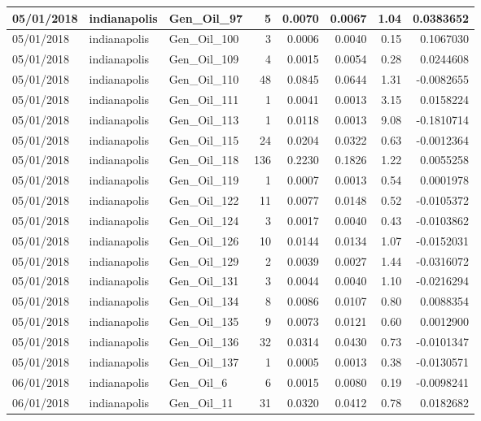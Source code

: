 \documentclass[
  letterpaper,
  DIV=11,
  numbers=noendperiod]{scrartcl}
\begin{document}
\begin{tabular}{l|l|l|r|r|r|r|r}
\hline
05/01/2018 & indianapolis & Gen\_Oil\_97 & 5 & 0.0070 & 0.0067 & 1.04 & 0.0383652\\
\hline
05/01/2018 & indianapolis & Gen\_Oil\_100 & 3 & 0.0006 & 0.0040 & 0.15 & 0.1067030\\
\hline
05/01/2018 & indianapolis & Gen\_Oil\_109 & 4 & 0.0015 & 0.0054 & 0.28 & 0.0244608\\
\hline
05/01/2018 & indianapolis & Gen\_Oil\_110 & 48 & 0.0845 & 0.0644 & 1.31 & -0.0082655\\
\hline
05/01/2018 & indianapolis & Gen\_Oil\_111 & 1 & 0.0041 & 0.0013 & 3.15 & 0.0158224\\
\hline
05/01/2018 & indianapolis & Gen\_Oil\_113 & 1 & 0.0118 & 0.0013 & 9.08 & -0.1810714\\
\hline
05/01/2018 & indianapolis & Gen\_Oil\_115 & 24 & 0.0204 & 0.0322 & 0.63 & -0.0012364\\
\hline
05/01/2018 & indianapolis & Gen\_Oil\_118 & 136 & 0.2230 & 0.1826 & 1.22 & 0.0055258\\
\hline
05/01/2018 & indianapolis & Gen\_Oil\_119 & 1 & 0.0007 & 0.0013 & 0.54 & 0.0001978\\
\hline
05/01/2018 & indianapolis & Gen\_Oil\_122 & 11 & 0.0077 & 0.0148 & 0.52 & -0.0105372\\
\hline
05/01/2018 & indianapolis & Gen\_Oil\_124 & 3 & 0.0017 & 0.0040 & 0.43 & -0.0103862\\
\hline
05/01/2018 & indianapolis & Gen\_Oil\_126 & 10 & 0.0144 & 0.0134 & 1.07 & -0.0152031\\
\hline
05/01/2018 & indianapolis & Gen\_Oil\_129 & 2 & 0.0039 & 0.0027 & 1.44 & -0.0316072\\
\hline
05/01/2018 & indianapolis & Gen\_Oil\_131 & 3 & 0.0044 & 0.0040 & 1.10 & -0.0216294\\
\hline
05/01/2018 & indianapolis & Gen\_Oil\_134 & 8 & 0.0086 & 0.0107 & 0.80 & 0.0088354\\
\hline
05/01/2018 & indianapolis & Gen\_Oil\_135 & 9 & 0.0073 & 0.0121 & 0.60 & 0.0012900\\
\hline
05/01/2018 & indianapolis & Gen\_Oil\_136 & 32 & 0.0314 & 0.0430 & 0.73 & -0.0101347\\
\hline
05/01/2018 & indianapolis & Gen\_Oil\_137 & 1 & 0.0005 & 0.0013 & 0.38 & -0.0130571\\
\hline
06/01/2018 & indianapolis & Gen\_Oil\_6 & 6 & 0.0015 & 0.0080 & 0.19 & -0.0098241\\
\hline
06/01/2018 & indianapolis & Gen\_Oil\_11 & 31 & 0.0320 & 0.0412 & 0.78 & 0.0182682\\

\end{tabular}
\end{document}
